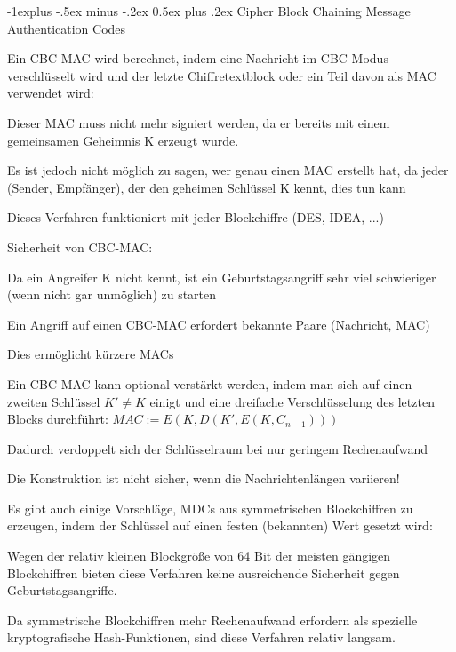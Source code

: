 \documentclass[a4paper]{article}
\makeatletter
\renewcommand{\subsection}{\@startsection{subsection}{2}{0mm}%
 {-1explus -.5ex minus -.2ex}%
 {0.5ex plus .2ex}%
 {\normalfont\normalsize\bfseries}}
\makeatother
\begin{document}
\begin{multicols}{3}
      \subsection{Cipher Block Chaining Message Authentication Codes}
      \begin{itemize*}
            \item Ein CBC-MAC wird berechnet, indem eine Nachricht im CBC-Modus verschlüsselt wird und der letzte Chiffretextblock oder ein Teil davon als MAC verwendet wird:
            \item Dieser MAC muss nicht mehr signiert werden, da er bereits mit einem gemeinsamen Geheimnis K erzeugt wurde.
            \begin{itemize*}
                  \item Es ist jedoch nicht möglich zu sagen, wer genau einen MAC erstellt hat, da jeder (Sender, Empfänger), der den geheimen Schlüssel K kennt, dies tun kann
            \end{itemize*}
            \item Dieses Verfahren funktioniert mit jeder Blockchiffre (DES, IDEA, ...)
            \item Sicherheit von CBC-MAC:
            \begin{itemize*}
                  \item Da ein Angreifer K nicht kennt, ist ein Geburtstagsangriff sehr viel schwieriger (wenn nicht gar unmöglich) zu starten
                  \item Ein Angriff auf einen CBC-MAC erfordert bekannte Paare (Nachricht, MAC)
                  \item Dies ermöglicht kürzere MACs
                  \item Ein CBC-MAC kann optional verstärkt werden, indem man sich auf einen zweiten Schlüssel $K'\not= K$ einigt und eine dreifache Verschlüsselung des letzten Blocks durchführt: $MAC:=E(K,D(K',E(K,C_{n-1})))$
                  \item Dadurch verdoppelt sich der Schlüsselraum bei nur geringem Rechenaufwand
                  \item Die Konstruktion ist nicht sicher, wenn die Nachrichtenlängen variieren!
            \end{itemize*}
            \item Es gibt auch einige Vorschläge, MDCs aus symmetrischen Blockchiffren zu erzeugen, indem der Schlüssel auf einen festen (bekannten) Wert gesetzt wird:
            \begin{itemize*}
                  \item Wegen der relativ kleinen Blockgröße von 64 Bit der meisten gängigen Blockchiffren bieten diese Verfahren keine ausreichende Sicherheit gegen Geburtstagsangriffe.
                  \item Da symmetrische Blockchiffren mehr Rechenaufwand erfordern als spezielle kryptografische Hash-Funktionen, sind diese Verfahren relativ langsam.
            \end{itemize*}
      \end{itemize*}


\end{multicols}
\end{document}
